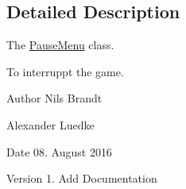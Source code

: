 \subsection{Detailed Description}
The \hyperlink{classPauseMenu}{Pause\-Menu} class. 

To interruppt the game.

\begin{DoxyAuthor}{Author}
Nils Brandt 

Alexander Luedke
\end{DoxyAuthor}
\begin{DoxyDate}{Date}
08. August 2016
\end{DoxyDate}
\begin{DoxyVersion}{Version}
1. Add Documentation 
\end{DoxyVersion}
